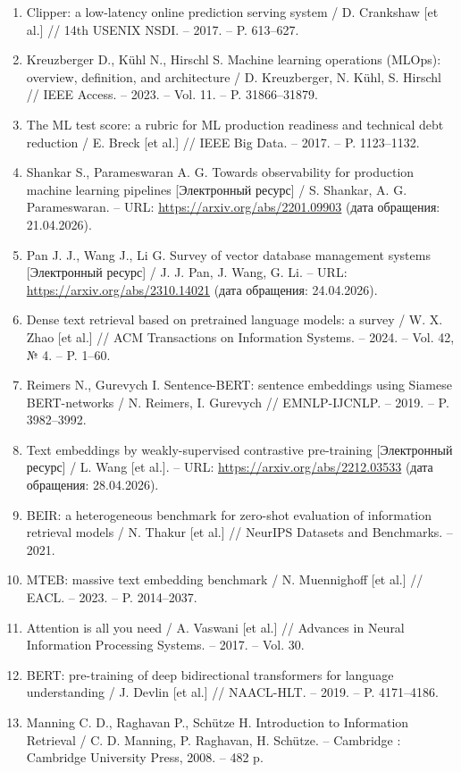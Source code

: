 \documentclass[14pt,a4paper]{extarticle}
\numberwithin{figure}{section}
\numberwithin{table}{section}
\begin{document}
\begin{enumerate}
\item Clipper: a low-latency online prediction serving system / D. Crankshaw [et al.] // 14th USENIX NSDI. -- 2017. -- P. 613--627.
\item Kreuzberger D., Kühl N., Hirschl S. Machine learning operations (MLOps): overview, definition, and architecture / D. Kreuzberger, N. Kühl, S. Hirschl // IEEE Access. -- 2023. -- Vol. 11. -- P. 31866--31879.
\item The ML test score: a rubric for ML production readiness and technical debt reduction / E. Breck [et al.] // IEEE Big Data. -- 2017. -- P. 1123--1132.
\item Shankar S., Parameswaran A. G. Towards observability for production machine learning pipelines [Электронный ресурс] / S. Shankar, A. G. Parameswaran. -- URL: \url{https://arxiv.org/abs/2201.09903} (дата обращения: 21.04.2026).
\item Pan J. J., Wang J., Li G. Survey of vector database management systems [Электронный ресурс] / J. J. Pan, J. Wang, G. Li. -- URL: \url{https://arxiv.org/abs/2310.14021} (дата обращения: 24.04.2026).
\item Dense text retrieval based on pretrained language models: a survey / W. X. Zhao [et al.] // ACM Transactions on Information Systems. -- 2024. -- Vol. 42, № 4. -- P. 1--60.
\item Reimers N., Gurevych I. Sentence-BERT: sentence embeddings using Siamese BERT-networks / N. Reimers, I. Gurevych // EMNLP-IJCNLP. -- 2019. -- P. 3982--3992.
\item Text embeddings by weakly-supervised contrastive pre-training [Электронный ресурс] / L. Wang [et al.]. -- URL: \url{https://arxiv.org/abs/2212.03533} (дата обращения: 28.04.2026).
\item BEIR: a heterogeneous benchmark for zero-shot evaluation of information retrieval models / N. Thakur [et al.] // NeurIPS Datasets and Benchmarks. -- 2021.
\item MTEB: massive text embedding benchmark / N. Muennighoff [et al.] // EACL. -- 2023. -- P. 2014--2037.
\item Attention is all you need / A. Vaswani [et al.] // Advances in Neural Information Processing Systems. -- 2017. -- Vol. 30.
\item BERT: pre-training of deep bidirectional transformers for language understanding / J. Devlin [et al.] // NAACL-HLT. -- 2019. -- P. 4171--4186.
\item Manning C. D., Raghavan P., Schütze H. Introduction to Information Retrieval / C. D. Manning, P. Raghavan, H. Schütze. -- Cambridge : Cambridge University Press, 2008. -- 482 p.

\end{enumerate}
\end{document}
